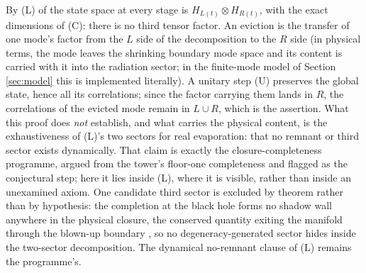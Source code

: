 By (L) of  the state space at every stage is $H_{L(t)} \otimes H_{R(t)}$, with the exact dimensions of (C): there is no third tensor factor. An eviction is the transfer of one mode's factor from the $L$ side of the decomposition to the $R$ side (in physical terms, the mode leaves the shrinking boundary mode space and its content is carried with it into the radiation sector; in the finite-mode model of Section \ref{sec:model} this is implemented literally). A unitary step (U) preserves the global state, hence all its correlations; since the factor carrying them lands in $R$, the correlations of the evicted mode remain in $L \cup R$, which is the assertion. What this proof does \emph{not} establish, and what carries the physical content, is the exhaustiveness of (L)'s two sectors for real evaporation: that no remnant or third sector exists dynamically. That claim is exactly the closure-completeness programme, argued from the tower's floor-one completeness \cite[Cor.~6.2]{ButlerT3} and flagged as the conjectural step; here it lies inside (L), where it is visible, rather than inside an unexamined axiom. One candidate third sector is excluded by theorem rather than by hypothesis: the completion at the black hole forms no shadow wall anywhere in the physical closure, the conserved quantity exiting the manifold through the blown-up boundary \cite[Thm.~8.12, Rem.~8.13]{ButlerT4}, so no degeneracy-generated sector hides inside the two-sector decomposition. The dynamical no-remnant clause of (L) remains the programme's.
